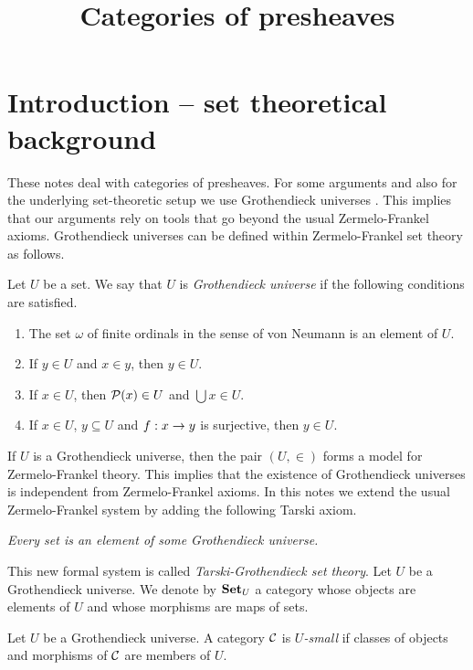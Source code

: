 



\title{Categories of presheaves}
\date{}
\maketitle

\section{Introduction -- set theoretical background}\label{section:introduction}
\noindent
These notes deal with categories of presheaves. For some arguments and also for the underlying set-theoretic setup we use Grothendieck universes {\cite[page 22]{Maclane}}. This implies that our arguments rely on tools that go beyond the usual Zermelo-Frankel axioms. Grothendieck universes can be defined within Zermelo-Frankel set theory as follows.

\begin{definition}
Let $U$ be a set. We say that $U$ is \textit{Grothendieck universe} if the following conditions are satisfied.
\begin{enumerate}[label=\textbf{(\arabic*)}, leftmargin=1.5em]
\item The set $\omega$ of finite ordinals in the sense of von Neumann is an element of $U$.
\item If $y\in U$ and $x\in y$, then $y\in U$.
\item If $x\in U$, then ${\mathcal P}(x)\in U$ and $\bigcup x\in U$.
\item If $x\in U$, $y\subseteq U$ and $f:x\rightarrow y$ is surjective, then $y\in U$.
\end{enumerate}
\end{definition}
\noindent
If $U$ is a Grothendieck universe, then the pair $(U,\in)$ forms a model for Zermelo-Frankel theory. This implies that the existence of Grothendieck universes is independent from Zermelo-Frankel axioms. In this notes we extend the usual Zermelo-Frankel system by adding the following Tarski axiom.
\begin{center}
\textit{Every set is an element of some Grothendieck universe.}
\end{center}
This new formal system is called \textit{Tarski-Grothendieck set theory}. Let $U$ be a Grothendieck universe. We denote by $\mathbf{Set}_U$ a category whose objects are elements of $U$ and whose morphisms are maps of sets. 

\begin{definition}
Let $U$ be a Grothendieck universe. A category ${\mathcal C}$ is \textit{$U$-small} if classes of objects and morphisms of ${\mathcal C}$ are members of $U$.
\end{definition}

